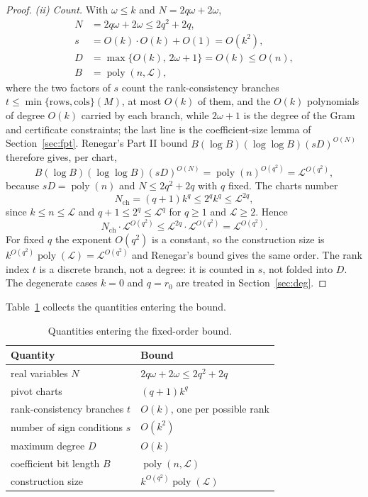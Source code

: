 \documentclass[journal]{IEEEtran}
\theoremstyle{plainn}
\theoremstyle{remark}
\begin{document}
\begin{proof}
\emph{(ii) Count.} With $\omega\le k$ and $N=2q\omega+2\omega$,
\begin{align}
N &= 2q\omega+2\omega\le 2q^2+2q,\\
s &= O(k)\cdot O(k)+O(1)=O(k^2),\\
D &= \max\{O(k),\,2\omega+1\}=O(k)\le O(n),\\
B &= \operatorname{poly}(n,\mathcal L),
\end{align}
where the two factors of $s$ count the rank-consistency branches
$t\le\min\{\text{rows},\text{cols}\}(M)$, at most $O(k)$ of them, and the
$O(k)$ polynomials of degree $O(k)$ carried by each branch, while $2\omega+1$
is the degree of the Gram and certificate constraints; the last line is the
coefficient-size lemma of Section~\ref{sec:fpt}. Renegar's Part II bound
$B(\log B)(\log\log B)(sD)^{O(N)}$ therefore gives, per chart,
\[
B(\log B)(\log\log B)(sD)^{O(N)}
=\operatorname{poly}(n)^{O(q^2)}
=\mathcal L^{O(q^2)},
\]
because $sD=\operatorname{poly}(n)$ and $N\le 2q^2+2q$ with $q$ fixed. The
charts number
\[
N_{\mathrm{ch}}=(q+1)k^{q}\le 2^{q}k^{q}\le\mathcal L^{2q},
\]
since $k\le n\le\mathcal L$ and $q+1\le 2^{q}\le\mathcal L^{q}$ for $q\ge1$
and $\mathcal L\ge2$. Hence
\[
N_{\mathrm{ch}}\cdot\mathcal L^{O(q^2)}
\le\mathcal L^{2q}\cdot\mathcal L^{O(q^2)}
=\mathcal L^{O(q^2)} .
\]
For fixed $q$ the exponent $O(q^2)$ is a constant, so the construction size is
$k^{O(q^2)}\operatorname{poly}(\mathcal L)=\mathcal L^{O(q^2)}$ and Renegar's
bound gives the same order. The rank index $t$ is a discrete branch, not a
degree: it is counted in $s$, not folded into $D$. The degenerate cases $k=0$
and $q=r_0$ are treated in Section~\ref{sec:deg}.
\end{proof}

Table~\ref{tab:4} collects the quantities entering the bound.

\begin{table}[!t]
\centering
\caption{Quantities entering the fixed-order bound.}\label{tab:4}
\small
\begin{tabular}{p{}p{}}
\toprule
Quantity & Bound \\
\midrule
real variables $N$ & $2q\omega+2\omega\le2q^2+2q$ \\
pivot charts & $(q+1)k^q$ \\
rank-consistency branches $t$ & $O(k)$, one per possible rank \\
number of sign conditions $s$ & $O(k^2)$ \\
maximum degree $D$ & $O(k)$ \\
coefficient bit length $B$ & $\operatorname{poly}(n,\mathcal L)$ \\
construction size & $k^{O(q^2)}\operatorname{poly}(\mathcal L)$ \\
\bottomrule
\end{tabular}
\end{table}
\end{document}
